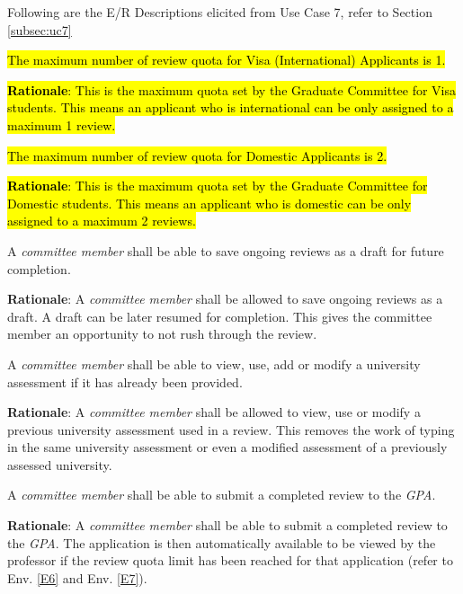 \documentclass[fontsize=12pt,paper=letter,twoside]{scrartcl}
\begin{document}
Following are the E/R Descriptions elicited from Use Case 7, refer to Section \ref{subsec:uc7}

\genenv
{\hl{The maximum number of review quota for Visa (International) Applicants is 1.}}

\smallskip
\noindent \hl{\textbf{Rationale}: This is the maximum quota set by the Graduate Committee for Visa students. This means an applicant who is international can be only assigned to a maximum 1 review.}
\label{E6}

\genenv
{\hl{The maximum number of review quota for Domestic Applicants is 2.}}
\label{E7}

\smallskip
\noindent \hl{\textbf{Rationale}: This is the maximum quota set by the Graduate Committee for Domestic students. This means an applicant who is domestic can be only assigned to a maximum 2 reviews.}

\genreq
{A \emph{committee member} shall be able to save ongoing reviews as a draft for future completion.\\}
{}
\label{R26}

\smallskip
\noindent \textbf{Rationale}: A \emph{committee member} shall be allowed to save ongoing reviews as a draft. A draft can be later resumed for completion. This gives the committee member an opportunity to not rush through the review.

\genreq
{A \emph{committee member} shall be able to view, use, add or modify a university assessment if it has already been provided.\\}
{}
\label{R27}

\smallskip
\noindent \textbf{Rationale}: A \emph{committee member} shall be allowed to view, use or modify a previous university assessment used in a review. This removes the work of typing in the same university assessment or even a modified assessment of a previously assessed university.

\rdescription
{A \emph{committee member} shall be able to submit a completed review to the \emph{GPA}.\\}
{}
\label{R28}

\smallskip
\noindent \textbf{Rationale}: A \emph{committee member} shall be able to submit a completed review to the \emph{GPA}. The application is then automatically available to be viewed by the professor if the review quota limit has been reached for that application (refer to Env. \ref{E6} and Env. \ref{E7}).
\end{document}
